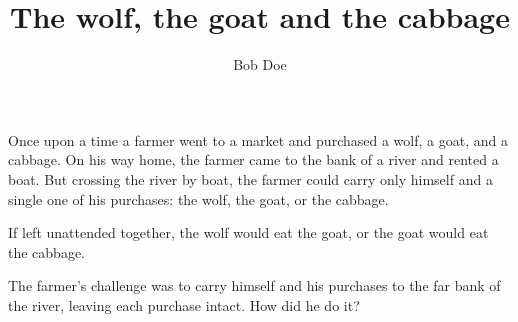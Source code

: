 \documentclass[a4paper,twoside] {article}
\title{The wolf, the goat and the cabbage }
\author{Bob Doe}
\begin{document}
\maketitle

Once upon a time a farmer went to a market and purchased a wolf, a goat, and
a cabbage. On his way home, the farmer came to the bank of a river and rented
a boat. But crossing the river by boat, the farmer could carry only himself
and a single one of his purchases: the wolf, the goat, or the cabbage.

If left unattended together, the wolf would eat the goat, or the goat would
eat the cabbage.

The farmer's challenge was to carry himself and his purchases to the far bank
of the river, leaving each purchase intact. How did he do it?
\end{document}

